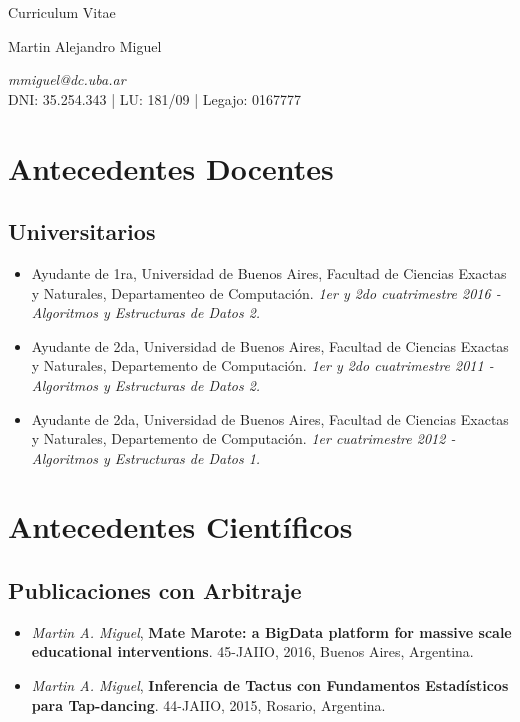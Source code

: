 \documentclass[a4paper,10pt]{article}
\begin{document}
\begin{center}
    { \Huge
    Curriculum Vitae}
\bigskip

{\Large Martin Alejandro Miguel} \\
\medskip

\emph{mmiguel@dc.uba.ar} \\
DNI: 35.254.343 | LU: 181/09 | Legajo: 0167777
\end{center}


\section{Antecedentes Docentes}

\subsection{Universitarios}

\begin{itemize}
    \item Ayudante de 1ra, Universidad de Buenos Aires, Facultad de Ciencias
        Exactas y Naturales, Departamenteo de Computación. \emph{1er y 2do
        cuatrimestre 2016 - Algoritmos y Estructuras de Datos 2.}
    \item Ayudante de 2da, Universidad de Buenos Aires, Facultad de Ciencias
Exactas y Naturales, Departemento de Computación. \emph{1er y 2do cuatrimestre
2011 - 
Algoritmos y Estructuras de Datos 2.}
    \item Ayudante de 2da, Universidad de Buenos Aires, Facultad de Ciencias
Exactas y Naturales, Departemento de Computación. \emph{1er cuatrimestre 2012 -
Algoritmos y Estructuras de Datos 1.}
\end{itemize}

\section{Antecedentes Científicos}

\subsection{Publicaciones con Arbitraje}

\begin{itemize}
    \item 
\emph{Martin A. Miguel}, 
\textbf{Mate Marote: a BigData platform for massive scale educational
        interventions}.
        45-JAIIO, 2016, Buenos Aires, Argentina.
    \item 
\emph{Martin A. Miguel}, 
\textbf{Inferencia de Tactus con Fundamentos Estadísticos para Tap-dancing}.
        44-JAIIO, 2015, Rosario, Argentina.
\end{itemize}
\end{document}
